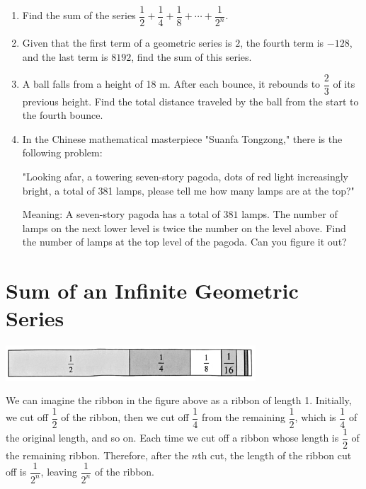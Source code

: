 \documentclass{report}
\begin{document}
        \begin{enumerate}
            \item Find the sum of the series $\dfrac{1}{2}+\dfrac{1}{4}+\dfrac{1}{8}+\cdots+\dfrac{1}{2^{n}}$.

            \item Given that the first term of a geometric series is $2$, the fourth term is $-128$, and the last term is $8192$, find the sum of this series.
            
            \item A ball falls from a height of 18 m. After each bounce, it rebounds to $\dfrac{2}{3}$ of its previous height. Find the total distance traveled by the ball from the start to the fourth bounce.
            
            \item In the Chinese mathematical masterpiece "Suanfa Tongzong," there is the following problem:
            
            "Looking afar, a towering seven-story pagoda, dots of red light increasingly bright, a total of 381 lamps, please tell me how many lamps are at the top?"
            
            Meaning: A seven-story pagoda has a total of $381$ lamps. The number of lamps on the next lower level is twice the number on the level above. Find the number of lamps at the top level of the pagoda. Can you figure it out?
        \end{enumerate}

        \section*{Sum of an Infinite Geometric Series}
        \begin{center}
            \includegraphics[width=0.7\textwidth]{assets/13-9.png}    
        \end{center}
        
        We can imagine the ribbon in the figure above as a ribbon of length 1. Initially, we cut off $\dfrac{1}{2}$ of the ribbon, then we cut off $\dfrac{1}{4}$ from the remaining $\dfrac{1}{2}$, which is $\dfrac{1}{4}$ of the original length, and so on. Each time we cut off a ribbon whose length is $\dfrac{1}{2}$ of the remaining ribbon. Therefore, after the $n$th cut, the length of the ribbon cut off is $\dfrac{1}{2^n}$, leaving $\dfrac{1}{2^n}$ of the ribbon.
\end{document}
